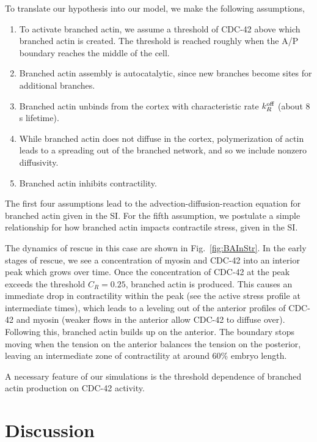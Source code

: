 \documentclass[11pt]{article}
\newcommand{\6}[1]{#1_{\text{6}}}
\newcommand{\3}[1]{#1_{\text{3}}}
\begin{document}
To translate our hypothesis into our model, we make the following assumptions, 
\begin{enumerate}
\item To activate branched actin, we assume a threshold of CDC-42 above which branched actin is created. The threshold is reached roughly when the A/P boundary reaches the middle of the cell.
\item Branched actin assembly is autocatalytic, since new branches become sites for additional branches.
\item Branched actin unbinds from the cortex with characteristic rate $k^\text{off}_R$ (about 8 s lifetime).
\item While branched actin does not diffuse in the cortex, polymerization of actin leads to a spreading out of the branched network, and so we include nonzero diffusivity. 
\item Branched actin inhibits contractility. 
\end{enumerate}
The first four assumptions lead to the advection-diffusion-reaction equation for branched actin given in the SI. For the fifth assumption, we postulate a simple relationship for how branched actin impacts contractile stress, given in the SI. 

The dynamics of rescue in this case are shown in Fig.\ \ref{fig:BAInStr}. In the early stages of rescue, we see a concentration of myosin and CDC-42 into an interior peak which grows over time. Once the concentration of CDC-42 at the peak exceeds the threshold $C_R=0.25$, branched actin is produced. This causes an immediate drop in contractility within the peak (see the active stress profile at intermediate times), which leads to a leveling out of the anterior profiles of CDC-42 and myosin (weaker flows in the anterior allow CDC-42 to diffuse over). Following this, branched actin builds up on the anterior. The boundary stops moving when the tension on the anterior balances the tension on the posterior, leaving an intermediate zone of contractility at around 60\% embryo length. 

A necessary feature of our simulations is the threshold dependence of branched actin production on CDC-42 activity.


\section{Discussion}
\end{document}
